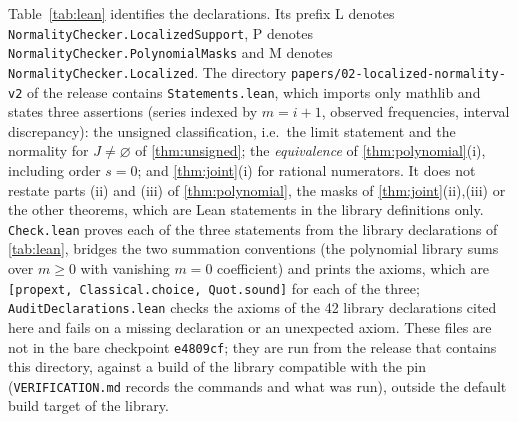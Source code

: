 \documentclass[11pt]{article}
\begin{document}
Table~\ref{tab:lean} identifies the declarations. Its prefix L denotes \texttt{NormalityChecker.LocalizedSupport}, P denotes \texttt{NormalityChecker.PolynomialMasks} and M denotes \texttt{NormalityChecker.Localized}. The directory \texttt{papers/02-localized-normality-v2} of the release contains \texttt{Statements.lean}, which imports only mathlib and states three assertions (series indexed by $m=i+1$, observed frequencies, interval discrepancy): the unsigned classification, i.e.\ the limit statement and the normality for $J\ne\varnothing$ of \cref{thm:unsigned}; the \emph{equivalence} of \cref{thm:polynomial}(i), including order $s=0$; and \cref{thm:joint}(i) for rational numerators. It does not restate parts (ii) and (iii) of \cref{thm:polynomial}, the masks of \cref{thm:joint}(ii),(iii) or the other theorems, which are Lean statements in the library definitions only. \texttt{Check.lean} proves each of the three statements from the library declarations of \cref{tab:lean}, bridges the two summation conventions (the polynomial library sums over $m\ge0$ with vanishing $m=0$ coefficient) and prints the axioms, which are \texttt{[propext, Classical.choice, Quot.sound]} for each of the three; \texttt{AuditDeclarations.lean} checks the axioms of the 42 library declarations cited here and fails on a missing declaration or an unexpected axiom. These files are not in the bare checkpoint \texttt{e4809cf}; they are run from the release that contains this directory, against a build of the library compatible with the pin (\texttt{VERIFICATION.md} records the commands and what was run), outside the default build target of the library.
\end{document}
